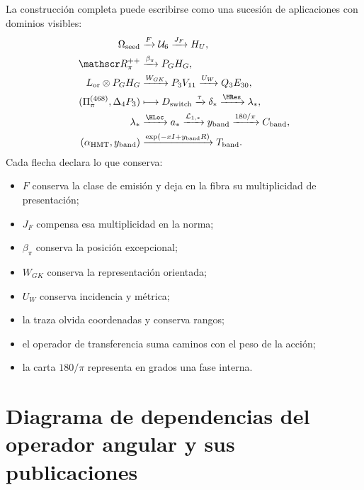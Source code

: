 La construcción completa puede escribirse como una sucesión de aplicaciones
con dominios visibles:
\[
\begin{aligned}
\Omega_{\rm seed}
&\xrightarrow{F}\mathcal U_6
\xrightarrow{J_F}H_U,\\
\mathscr R_\pi^{++}
&\xrightarrow{\beta_\pi}P_GH_G,\\
L_{\rm or}\otimes P_GH_G
&\xrightarrow{W_{GK}}P_3V_{11}
\xrightarrow{U_W}Q_3E_{30},\\
(\Pi_\pi^{(468)},\Delta_4P_3)
&\longmapsto D_{\rm switch}
\xrightarrow{\tau}\delta_*
\xrightarrow{\rm \HRes}\lambda_*,\\
\lambda_*
&\xrightarrow{\rm \HLoc}a_*
\xrightarrow{\mathcal L_{1,*}}y_{\rm band}
\xrightarrow{180/\pi}C_{\rm band},\\
(\alpha_{\rm HMT},y_{\rm band})
&\xrightarrow{\exp(-xI+y_{\rm band}R)}T_{\rm band}.
\end{aligned}
\]
Cada flecha declara lo que conserva:
\begin{itemize}
  \item \(F\) conserva la clase de emisión y deja en la fibra su
  multiplicidad de presentación;
  \item \(J_F\) compensa esa multiplicidad en la norma;
  \item \(\beta_\pi\) conserva la posición excepcional;
  \item \(W_{GK}\) conserva la representación orientada;
  \item \(U_W\) conserva incidencia y métrica;
  \item la traza olvida coordenadas y conserva rangos;
  \item el operador de transferencia suma caminos con el peso de la acción;
  \item la carta \(180/\pi\) representa en grados una fase interna.
\end{itemize}

\section{Diagrama de dependencias del operador angular y sus publicaciones}

